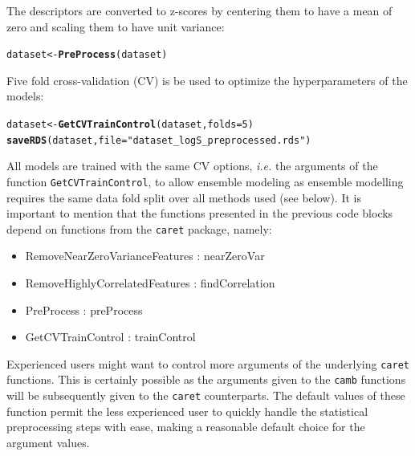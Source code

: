 \documentclass[twoside,a4wide,12pt]{article}\usepackage[]{graphicx}\usepackage[]{color}
\makeatletter
\newcommand{\hlnum}[1]{\textcolor[rgb]{0.686,0.059,0.569}{#1}}%
\newcommand{\hlstr}[1]{\textcolor[rgb]{0.192,0.494,0.8}{#1}}%
\newcommand{\hlstd}[1]{\textcolor[rgb]{0.345,0.345,0.345}{#1}}%
\newcommand{\hlkwb}[1]{\textcolor[rgb]{0.69,0.353,0.396}{#1}}%
\newcommand{\hlkwc}[1]{\textcolor[rgb]{0.333,0.667,0.333}{#1}}%
\newcommand{\hlkwd}[1]{\textcolor[rgb]{0.737,0.353,0.396}{\textbf{#1}}}%
\newenvironment{kframe}{%
 \def\at@end@of@kframe{}%
 \ifinner\ifhmode%
  \def\at@end@of@kframe{\end{minipage}}%
  \begin{minipage}{\columnwidth}%
 \fi\fi%
 \def\FrameCommand##1{\hskip\@totalleftmargin \hskip-\fboxsep
 \colorbox{shadecolor}{##1}\hskip-\fboxsep
     \hskip-\linewidth \hskip-\@totalleftmargin \hskip\columnwidth}%
 \MakeFramed {\advance\hsize-\width
   \@totalleftmargin\z@ \linewidth\hsize
   \@setminipage}}%
 {\par\unskip\endMakeFramed%
 \at@end@of@kframe}
\newenvironment{knitrout}{}{} %
\makeatother
\begin{document}
The descriptors are converted to z-scores by centering them to have a mean of zero and scaling them to have unit variance:
\begin{knitrout}
\color{fgcolor}\begin{kframe}
\begin{alltt}
\hlstd{dataset} \hlkwb{<-} \hlkwd{PreProcess}\hlstd{(dataset)}
\end{alltt}
\end{kframe}
\end{knitrout}

Five fold cross-validation (CV) is be used to optimize the hyperparameters of the models:
\begin{knitrout}
\color{fgcolor}\begin{kframe}
\begin{alltt}
\hlstd{dataset} \hlkwb{<-} \hlkwd{GetCVTrainControl}\hlstd{(dataset,} \hlkwc{folds} \hlstd{=} \hlnum{5}\hlstd{)}
\hlkwd{saveRDS}\hlstd{(dataset,} \hlkwc{file} \hlstd{=} \hlstr{"dataset_logS_preprocessed.rds"}\hlstd{)}
\end{alltt}
\end{kframe}
\end{knitrout}

All models are trained with the same CV options, {\it i.e.} the arguments of the function \texttt{GetCVTrainControl}, to allow ensemble modeling as ensemble modelling requires the same data fold split over all methods used (see below).
It is important to mention that the functions presented in the previous code blocks depend on functions from the \texttt{caret} package, namely: 
\begin{itemize}
\item RemoveNearZeroVarianceFeatures : nearZeroVar
\item RemoveHighlyCorrelatedFeatures : findCorrelation
\item PreProcess : preProcess
\item GetCVTrainControl : trainControl
\end{itemize}
Experienced users might want to control more arguments of the underlying \texttt{caret} functions.
This is certainly possible as the arguments given to the \texttt{camb} functions will be subsequently given to the \texttt{caret} counterparts.
The default values of these function permit the less experienced user to quickly handle the statistical preprocessing
steps with ease, making a reasonable default choice for the argument values.
\end{document}
